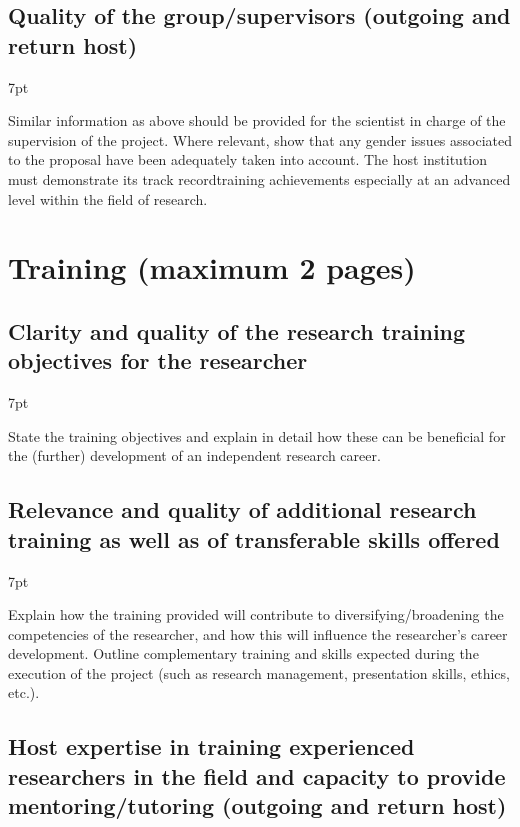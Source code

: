 \documentclass[11pt]{ltxdoc}
\newenvironment{formal}{%
  \def\FrameCommand{%
    \hspace{1pt}%
    {\color{darkblue}\vrule width 2pt}%
    {\color{formalshade}\vrule width 4pt}%
    \colorbox{formalshade}%
  }%
  \MakeFramed{\advance\hsize-\width\FrameRestore}%
  \noindent\hspace{-4.55pt}%
  \begin{adjustwidth}{}{7pt}%
  \vspace{2pt}\vspace{2pt}%
}
{%
  \vspace{2pt}\end{adjustwidth}\endMakeFramed%
}
\begin{document}
\subsection{Quality of the group/supervisors (outgoing and return
  host)}

\begin{formal}
  Similar information as above should be provided for the scientist in
  charge of the supervision of the project. Where relevant, show that
  any gender issues associated to the proposal have been adequately
  taken into account. The host institution must demonstrate its track
  recordtraining achievements especially at an advanced level within
  the field of research.
\end{formal}


\section{Training  (maximum 2 pages)}

\subsection{Clarity and quality of the research training objectives
  for the researcher}

\begin{formal}
  State the training objectives and explain in detail how these can be
  beneficial for the (further) development of an independent research
  career.
\end{formal}

\subsection{Relevance and quality of additional research training as
  well as of transferable skills offered}

\begin{formal}
  Explain how the training provided will contribute to
  diversifying/broadening the competencies of the researcher, and how
  this will influence the researcher's career development. Outline
  complementary training and skills expected during the execution of
  the project (such as research management, presentation skills,
  ethics, etc.).
\end{formal}

\subsection{Host expertise in training experienced researchers in the
  field and capacity to provide mentoring/tutoring (outgoing and
  return host)}
\end{document}
